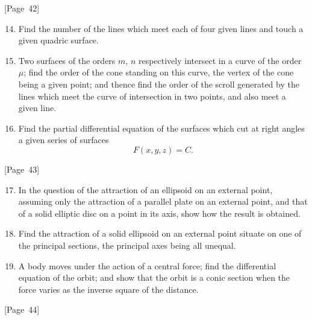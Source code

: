 \documentclass[11pt,a4paper]{book}
\begin{document}
\begin{center}
[Page~42]
\end{center}

\begin{enumerate}
\setcounter{enumi}{13}
\item Find the number of the lines which meet each of four given lines
and touch a given quadric surface.

\item Two surfaces of the orders $m$, $n$ respectively intersect in a
curve of the order $\mu$; find the order of the cone standing on this
curve, the vertex of the cone being a given point; and thence find the
order of the scroll generated by the lines which meet the curve of
intersection in two points, and also meet a given line.

\item Find the partial differential equation of the surfaces which cut
at right angles a given series of surfaces
\[
F(x,y,z) = C.
\]
\end{enumerate}

\begin{center}
[Page~43]
\end{center}

\begin{enumerate}
\setcounter{enumi}{16}
\item In the question of the attraction of an ellipsoid on an external
point, assuming only the attraction of a parallel plate on an external
point, and that of a solid elliptic disc on a point in its axis, show
how the result is obtained.

\item Find the attraction of a solid ellipsoid on an external point
situate on one of the principal sections, the principal axes being all
unequal.

\item A body moves under the action of a central force; find the
differential equation of the orbit; and show that the orbit is a conic
section when the force varies as the inverse square of the distance.
\end{enumerate}

\begin{center}
[Page~44]
\end{center}
\end{document}
